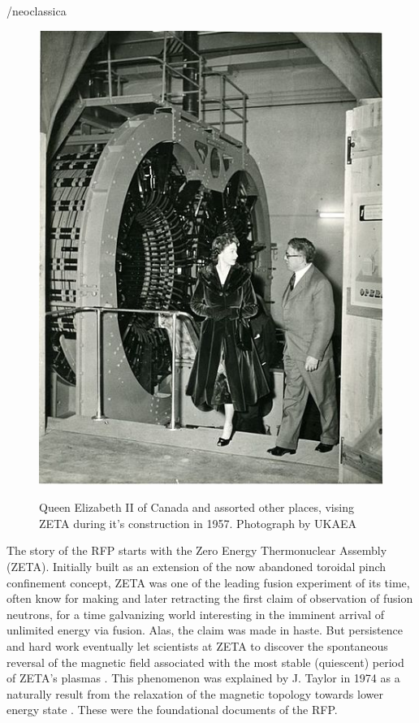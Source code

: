 \begin{refsection}
/neoclassica\begin{figure}[!htb]
	\centering
	\includegraphics[width = 0.75\linewidth]{./1_Introduction/queen_at_zeta.jpg}
    \label{fig:Queen_at_ZETA}
    \caption[Queen Elizabeth II at the ZETA experiment]{Queen Elizabeth II of Canada and assorted other places, vising ZETA during it's construction in 1957. Photograph by UKAEA}
\end{figure}%

The story of the RFP starts with the Zero Energy Thermonuclear Assembly (ZETA).
Initially built as an extension of the now abandoned toroidal pinch confinement
concept, ZETA was one of the leading fusion experiment of its time, often know
for making and later retracting the first claim of observation of fusion
neutrons, for a time galvanizing world interesting in the imminent arrival of
unlimited energy via fusion. Alas, the claim was made in haste. But persistence
and hard work eventually let scientists at ZETA to discover the spontaneous
reversal of the magnetic field associated with the most stable (quiescent)
period of ZETA's plasmas \cite{Butt_IAEA66,Robinson_IAEA69}. This phenomenon
was explained by J. Taylor in 1974 as a naturally result from the relaxation of
the magnetic topology towards lower energy state \cite{Taylor74}. These were
the foundational documents of the RFP.


\end{refsection}
